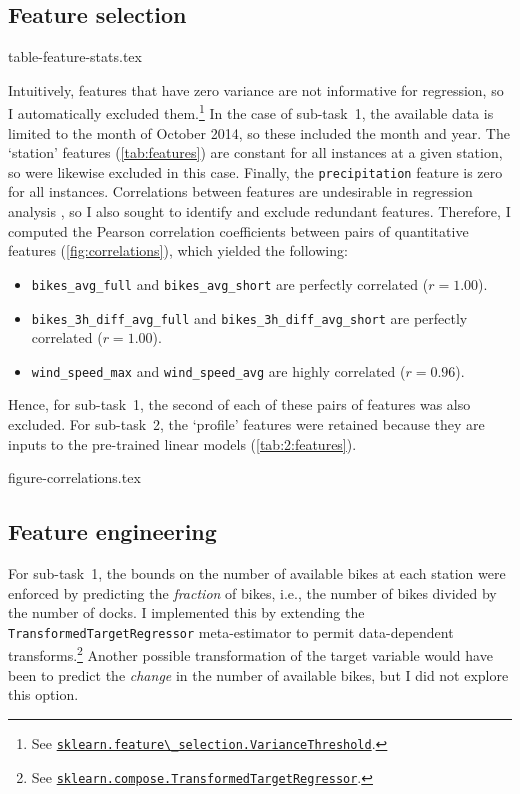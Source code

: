 \documentclass[11pt]{extarticle}
\newcommand{\windspeedmax}{\texttt{wind\_speed\_max}}
\newcommand{\windspeedavg}{\texttt{wind\_speed\_avg}}
\newcommand{\bikesavgfull}{\texttt{bikes\_avg\_full}}
\newcommand{\bikesavgshort}{\texttt{bikes\_avg\_short}}
\newcommand{\bikeshdiffavgfull}{\texttt{bikes\_3h\_diff\_avg\_full}}
\newcommand{\bikeshdiffavgshort}{\texttt{bikes\_3h\_diff\_avg\_short}}
\newcommand{\sklearn}[2]{\href{https://scikit-learn.org/stable/modules/generated/sklearn.#1.#2.html}{\lstinline|sklearn.#1.#2|}}
\begin{document}
\subsection{Feature selection}
\label{sec:feature-selection}

{table-feature-stats.tex}

Intuitively, features that have zero variance are not informative for regression, so I
automatically excluded them.\footnote{See
  \sklearn{feature\_selection}{VarianceThreshold}.
}
In the case of sub-task~1, the available data is limited to the month of October 2014,
so these included the month and year.
The `station' features (\cref{tab:features}) are constant for all instances at a given
station, so were likewise excluded in this case.
Finally, the \texttt{precipitation} feature is zero for all instances.
Correlations between features are undesirable in regression analysis
\parencite{Alin2010}, so I also sought to identify and exclude redundant features.
Therefore, I computed the Pearson correlation coefficients between pairs of
quantitative features (\cref{fig:correlations}), which yielded the following:
\begin{itemize}
  \item \texttt{\bikesavgfull} and \texttt{\bikesavgshort} are perfectly correlated ($r = 1.00$).
  \item \texttt{\bikeshdiffavgfull} and \texttt{\bikeshdiffavgshort} are perfectly correlated ($r  = 1.00$).
  \item \texttt{\windspeedmax} and \texttt{\windspeedavg} are highly correlated ($r = 0.96$).
\end{itemize}
Hence, for sub-task~1, the second of each of these pairs of features was also excluded.
For sub-task~2, the `profile' features were retained because they are inputs to the
pre-trained linear models (\cref{tab:2:features}).

{figure-correlations.tex}

\subsection{Feature engineering}
\label{sec:feature-engineering}

For sub-task~1, the bounds on the number of available bikes at each station were
enforced by predicting the \emph{fraction} of bikes, i.e., the number of bikes divided
by the number of docks.
I implemented this by extending the \texttt{TransformedTargetRegressor} meta-estimator
to permit data-dependent transforms.\footnote{See
  \sklearn{compose}{TransformedTargetRegressor}.
}
Another possible transformation of the target variable would have been to predict the
\emph{change} in the number of available bikes, but I did not explore this option.
\end{document}
